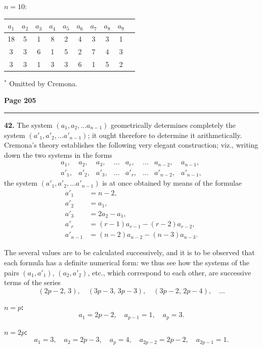 \documentclass[12pt,a4paper]{article}
\theoremstyle{plain}
\theoremstyle{definition}
\theoremstyle{remark}
\begin{document}
\noindent\textbf{$n = 10$}:
\begin{tabular}[t]{cccccccccc}
$a_1$ & $a_2$ & $a_3$ & $a_4$ & $a_5$ & $a_6$ & $a_7$ & $a_8$ & $a_9$ & \\
\hline
18 & 5 & 1 & 8 & 2 & 4 & 3 & 3 & 1 & \\
3 & 3 & 6 & 1 & 5 & 2 & 7 & 4 & 3 & \\
3 & 3 & 1 & 3 & 3 & 6 & 1 & 5 & 2 & \\
\end{tabular}

\noindent $^*$ Omitted by Cremona.

\newpage
\noindent\textbf{Page 205}\\
\noindent\rule{\textwidth}{0.4pt}

\smallskip

\noindent\textbf{42.} The system $(a_1, a_2, \ldots a_{n-1})$ geometrically determines completely the system $(a'_1, a'_2, \ldots a'_{n-1})$; it ought therefore to determine it arithmetically. Cremona's theory establishes the following very elegant construction; viz., writing down the two systems in the forms
\[
\begin{array}{cccccccc}
a_1, & a_2, & a_3, & \ldots & a_r, & \ldots & a_{n-2}, & a_{n-1}, \\
a'_1, & a'_2, & a'_3, & \ldots & a'_r, & \ldots & a'_{n-2}, & a'_{n-1},
\end{array}
\]
the system $(a'_1, a'_2, \ldots a'_{n-1})$ is at once obtained by means of the formulae
\begin{align*}
a'_1 &= n - 2, \\
a'_2 &= a_1, \\
a'_3 &= 2a_2 - a_1, \\
a'_r &= (r-1)a_{r-1} - (r-2)a_{r-2}, \\
a'_{n-1} &= (n-2)a_{n-2} - (n-3)a_{n-3}.
\end{align*}

\noindent The several values are to be calculated successively, and it is to be observed that each formula has a definite numerical form: we thus see how the systems of the pairs $(a_1, a'_1)$, $(a_2, a'_2)$, etc., which correspond to each other, are successive terms of the series
\[
(2p - 2,\, 3),\quad (3p - 3,\, 3p - 3),\quad (3p - 2,\, 2p - 4),\quad \ldots
\]

\noindent\textbf{$n = p$:}
\[
a_1 = 2p - 2, \quad a_{p-1} = 1, \quad a_p = 3.
\]

\noindent\textbf{$n = 2p$:}
\[
a_1 = 3, \quad a_2 = 2p - 3, \quad a_p = 4, \quad a_{2p-2} = 2p - 2, \quad a_{2p-1} = 1.
\]
\end{document}
